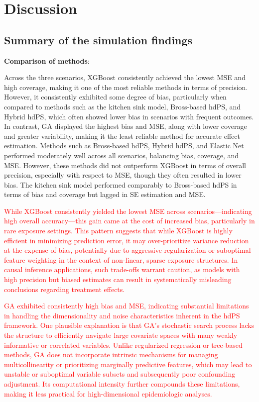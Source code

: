 \documentclass[10pt,letterpaper]{article}
\begin{document}
\section{Discussion}\label{discussion}

\subsection{Summary of the simulation
findings}\label{summary-of-the-simulation-findings}

\textbf{Comparison of methods}:

Across the three scenarios, XGBoost consistently achieved the lowest MSE
and high coverage, making it one of the most reliable methods in terms
of precision. However, it consistently exhibited some degree of bias,
particularly when compared to methods such as the kitchen sink model,
Bross-based hdPS, and Hybrid hdPS, which often showed lower bias in
scenarios with frequent outcomes. In contrast, GA displayed the highest
bias and MSE, along with lower coverage and greater variability, making
it the least reliable method for accurate effect estimation. Methods
such as Bross-based hdPS, Hybrid hdPS, and Elastic Net performed
moderately well across all scenarios, balancing bias, coverage, and MSE.
However, these methods did not outperform XGBoost in terms of overall
precision, especially with respect to MSE, though they often resulted in
lower bias. The kitchen sink model performed comparably to Bross-based
hdPS in terms of bias and coverage but lagged in SE estimation and MSE.

\textcolor{red}{While XGBoost consistently yielded the lowest MSE across scenarios—indicating high overall accuracy—this gain came at the cost of increased bias, particularly in rare exposure settings. This pattern suggests that while XGBoost is highly efficient in minimizing prediction error, it may over-prioritize variance reduction at the expense of bias, potentially due to aggressive regularization or suboptimal feature weighting in the context of non-linear, sparse exposure structures. In causal inference applications, such trade-offs warrant caution, as models with high precision but biased estimates can result in systematically misleading conclusions regarding treatment effects.}

\textcolor{red}{GA exhibited consistently high bias and MSE, indicating substantial limitations in handling the dimensionality and noise characteristics inherent in the hdPS framework. One plausible explanation is that GA’s stochastic search process lacks the structure to efficiently navigate large covariate spaces with many weakly informative or correlated variables. Unlike regularized regression or tree-based methods, GA does not incorporate intrinsic mechanisms for managing multicollinearity or prioritizing marginally predictive features, which may lead to unstable or suboptimal variable subsets and subsequently poor confounding adjustment. Its computational intensity further compounds these limitations, making it less practical for high-dimensional epidemiologic analyses.}
\end{document}

